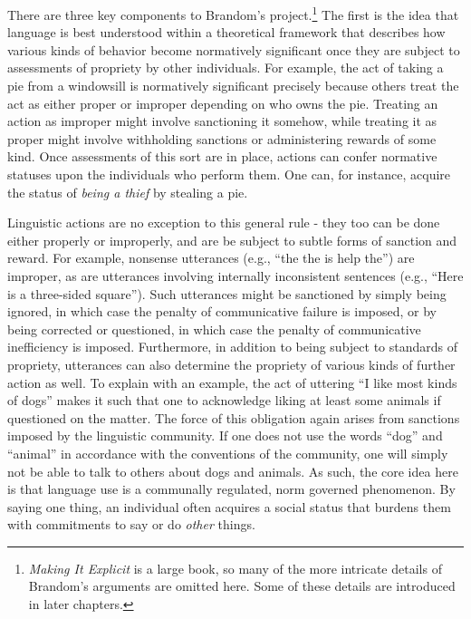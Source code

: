 There are three key components to Brandom's project.\footnote{\textit{Making It Explicit} is a large book, so many of the more intricate details of Brandom's arguments are omitted here. Some of these details are introduced in later chapters.} The first is the idea that language is best understood within a theoretical framework that describes how various kinds of behavior become normatively significant once they are subject to assessments of propriety by other individuals. For example, the act of taking a pie from a windowsill is normatively significant precisely because others treat the act as either proper or improper depending on who owns the pie. Treating an action as improper might involve sanctioning it somehow, while treating it as proper might involve withholding sanctions or administering rewards of some kind. Once assessments of this sort are in place, actions can confer normative statuses upon the individuals who perform them. One can, for instance, acquire the status of \textit{being a thief} by stealing a pie. 

Linguistic actions are no exception to this general rule - they too can be done either properly or improperly, and are be subject to subtle forms of sanction and reward. For example, nonsense utterances (e.g., ``the the is help the'') are improper, as are utterances involving internally inconsistent sentences (e.g., ``Here is a three-sided square''). Such utterances might be sanctioned by simply being ignored, in which case the penalty of communicative failure is imposed, or by being corrected or questioned, in which case the penalty of communicative inefficiency is imposed. Furthermore, in addition to being subject to standards of propriety, utterances can also determine the propriety of various kinds of further action as well. To explain with an example, the act of uttering ``I like most kinds of dogs'' makes it such that one  to acknowledge liking at least some animals if questioned on the matter. The force of this obligation again arises from sanctions imposed by the linguistic community. If one does not use the words ``dog'' and ``animal'' in accordance with the conventions of the community, one will simply not be able to talk to others about dogs and animals. As such, the core idea here is that language use is a communally regulated, norm governed phenomenon. By saying one thing, an individual often acquires a social status that burdens them with commitments to say or do \textit{other} things.

